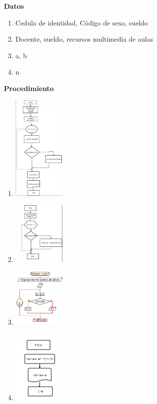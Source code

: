 \textbf{Datos}
\begin{enumerate}
\item  Cedula de identidad, Código de sexo, sueldo
\item  Docente, sueldo, recursos multimedia de aulas
\item  a, b
\item  n
\end{enumerate}
\textbf{Procedimiento}
\begin{enumerate}
\item \includegraphics[width=0.2\textwidth]{img/2-a.png}
\item \includegraphics[width=0.2\textwidth]{img/2-b.png}
\item \includegraphics[width=0.2\textwidth]{img/2-c.png}
\item \includegraphics[width=0.2\textwidth]{img/2-d.png}
\end{enumerate}
  
